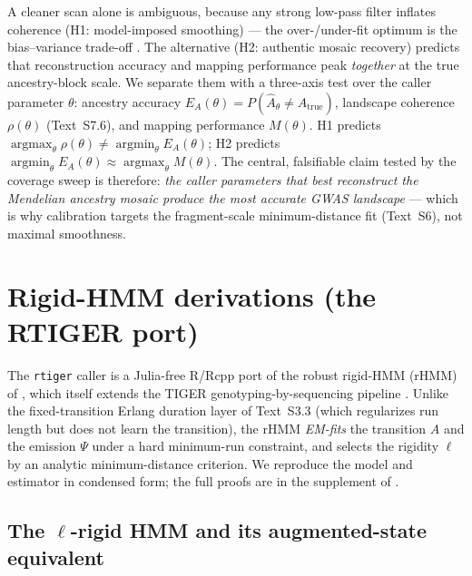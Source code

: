 \documentclass[11pt]{article}
\DeclareMathOperator*{\argmax}{argmax}
\DeclareMathOperator*{\argmin}{argmin}
\providecommand{\rtiger}{\texttt{rtiger}\xspace}
\begin{document}
A cleaner scan alone is ambiguous, because any strong low-pass filter inflates
coherence (H1: model-imposed smoothing) --- the over-/under-fit optimum is the
bias--variance trade-off \citep{geman_1992}. The alternative (H2: authentic mosaic
recovery) predicts that reconstruction accuracy and mapping performance peak
\emph{together} at the true ancestry-block scale. We separate them with a three-axis
test over the caller parameter $\theta$: ancestry accuracy $E_A(\theta)=P(\hat A_\theta\ne A_{\text{true}})$,
landscape coherence $\rho(\theta)$ (Text~S7.6), and mapping performance $M(\theta)$.
H1 predicts $\argmax_\theta\rho(\theta)\ne\argmin_\theta E_A(\theta)$; H2 predicts
$\argmin_\theta E_A(\theta)\approx\argmax_\theta M(\theta)$. The central,
falsifiable claim tested by the coverage sweep is therefore: \emph{the caller
parameters that best reconstruct the Mendelian ancestry mosaic produce the most
accurate GWAS landscape} --- which is why calibration targets the fragment-scale
minimum-distance fit (Text~S6), not maximal smoothness.

\section{Rigid-HMM derivations (the RTIGER port)}
\label{sec:rhmm}

The \rtiger caller is a Julia-free R/Rcpp port of the robust rigid-HMM (rHMM)
of \citet{rtiger_2023}, which itself extends the TIGER genotyping-by-sequencing
pipeline \citep{tiger_2015}. Unlike the fixed-transition Erlang duration layer of
Text~S3.3 (which regularizes run length but does not learn the transition), the rHMM
\emph{EM-fits} the transition $A$ and the emission $\Psi$ under a hard minimum-run
constraint, and selects the rigidity $\ell$ by an analytic minimum-distance criterion.
We reproduce the model and estimator in condensed form; the full proofs are in the
supplement of \citet{rtiger_2023}.

\subsection{The $\ell$-rigid HMM and its augmented-state equivalent}
\label{sec:rhmm-model}
\end{document}

